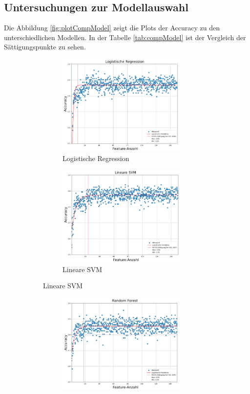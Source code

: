 \subsection{Untersuchungen zur Modellauswahl} \label{sec:ErgebModSelEval}
Die Abbildung \ref{fig:plotCompModel} zeigt die Plots der Accuracy zu den unterschiedlichen Modellen. In der Tabelle \ref{tab:compModel} ist der Vergleich der Sättigungspunkte zu sehen.

\begin{figure}[p]
     \centering
     \begin{subfigure}[b]{0.9\textwidth}
         \begin{subfigure}[b]{0.49\textwidth}
             \centering
             \includegraphics[width=\textwidth, height=5cm]{img/Plots/Modell Auswahl/Logistic Regression - Accuracy Plot.png}
             \caption{Logistische Regression}
         \end{subfigure}
         \hfill
         \begin{subfigure}[b]{0.49\textwidth}
             \centering
             \includegraphics[width=\textwidth, height=5cm]{img/Plots/Modell Auswahl/Linea SVM - Accuracy Plot.png}
             \caption{Lineare SVM}
         \end{subfigure}
     \end{subfigure}
     \hfill
     \begin{subfigure}[b]{0.9\textwidth}
         \begin{subfigure}[b]{0.49\textwidth}
             \centering
             \includegraphics[width=\textwidth, height=5cm]{img/Plots/Modell Auswahl/Random Forest - Accuracy Plot.png}

\end{subfigure}
\end{subfigure}
\end{figure}
